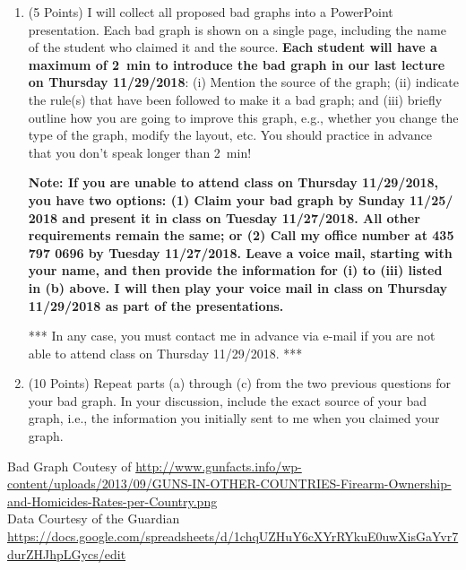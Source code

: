 \documentclass[12pt,letterpaper,final]{article}
\begin{document}
\begin{enumerate}
\begin{enumerate}
\item (5 Points) I will collect all proposed bad graphs into a PowerPoint presentation.
Each bad graph is shown on a single page, including the name of the student who claimed it
and the source. {\bf Each student will have a maximum of 2~min to introduce the bad graph
in our last lecture on Thursday 11/29/2018}:
(i) Mention the source of the graph; (ii) indicate the rule(s) that have been followed
to make it a bad graph; and (iii) briefly outline how you are going to improve this graph,
e.g., whether you change the type of the graph, modify the layout, etc.
You should practice in advance that you don't speak longer than 2~min!

{\bf Note: If you are unable to attend class on Thursday 11/29/2018, 
you have two options:
(1) Claim your bad graph by Sunday 11/25/ 2018 and present it in class on
Tuesday 11/27/2018. All other requirements remain the same; or
(2) Call my office number at 435 797 0696 by Tuesday 11/27/2018.
Leave a voice mail, starting with your name, and then
provide the information for (i) to (iii) listed in (b) above. 
I will then play your voice mail in class
on Thursday 11/29/2018 as part of the presentations.

*** In any case, you must contact me in advance via e-mail if you are
not able to attend class on Thursday 11/29/2018. ***}


\item (10 Points) Repeat parts (a) through (c) from the two previous questions for your bad graph.
In your discussion, include the exact source of your bad graph, i.e., the information
you initially sent to me when you claimed your graph.

\end{enumerate}

Bad Graph Coutesy of \url{http://www.gunfacts.info/wp-content/uploads/2013/09/GUNS-IN-OTHER-COUNTRIES-Firearm-Ownership-and-Homicides-Rates-per-Country.png}\\
Data Courtesy of the Guardian\\ \url{https://docs.google.com/spreadsheets/d/1chqUZHuY6cXYrRYkuE0uwXisGaYvr7durZHJhpLGycs/edit}\\


\end{enumerate}
\end{document}
